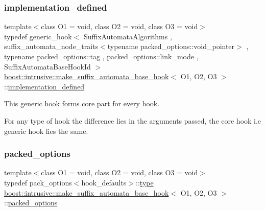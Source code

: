 \subsubsection{\texorpdfstring{implementation\+\_\+defined}{implementation\_defined}}
{\footnotesize\ttfamily template$<$class O1 = void, class O2 = void, class O3 = void$>$ \\
typedef generic\+\_\+hook$<$ Suffix\+Automata\+Algorithms , suffix\+\_\+automata\+\_\+node\+\_\+traits$<$typename packed\+\_\+options\+::void\+\_\+pointer$>$ , typename packed\+\_\+options\+::tag , packed\+\_\+options\+::link\+\_\+mode , Suffix\+Automata\+Base\+Hook\+Id $>$ \hyperlink{classboost_1_1intrusive_1_1make__suffix__automata__base__hook}{boost\+::intrusive\+::make\+\_\+suffix\+\_\+automata\+\_\+base\+\_\+hook}$<$ O1, O2, O3 $>$\+::\hyperlink{classboost_1_1intrusive_1_1make__suffix__automata__base__hook_a8b3a0f3343ae07dbe98811acc5c67d10}{implementation\+\_\+defined}}


\begin{DoxyItemize}
\item This generic hook forms core part for every hook.  
\item For any type of hook the difference lies in the arguments passed, the core hook i.\+e generic hook lies the same. 
\end{DoxyItemize}\mbox{\label{classboost_1_1intrusive_1_1make__suffix__automata__base__hook_af169eb92a361f67464ec4beb9ff5a314}} 
\subsubsection{\texorpdfstring{packed\+\_\+options}{packed\_options}}
{\footnotesize\ttfamily template$<$class O1 = void, class O2 = void, class O3 = void$>$ \\
typedef pack\+\_\+options$<$hook\+\_\+defaults$>$\+::\hyperlink{classboost_1_1intrusive_1_1make__suffix__automata__base__hook_a3fbc0981de4bc6f6e162259d87cfa3aa}{type} \hyperlink{classboost_1_1intrusive_1_1make__suffix__automata__base__hook}{boost\+::intrusive\+::make\+\_\+suffix\+\_\+automata\+\_\+base\+\_\+hook}$<$ O1, O2, O3 $>$\+::\hyperlink{classboost_1_1intrusive_1_1make__suffix__automata__base__hook_af169eb92a361f67464ec4beb9ff5a314}{packed\+\_\+options}}

